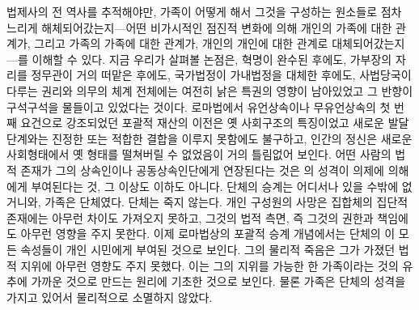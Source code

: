 법제사의 전 역사를 추적해야만,
가족이 어떻게 해서 그것을 구성하는 원소들로 점차 느리게
해체되어갔는지---어떤 비가시적인 점진적 변화에 의해
개인의 가족에 대한 관계가,
그리고 가족의 가족에 대한 관계가,
개인의 개인에 대한 관계로 대체되어갔는지---를
이해할 수 있다.
지금 우리가 살펴볼 논점은,
혁명이 완수된 후에도,
가부장의 자리를 정무관이 거의 떠맡은 후에도,
국가법정이 가내법정을 대체한 후에도,
사법당국이 다루는 권리와 의무의 체계 전체에는 여전히
낡은 특권의 영향이 남아있었고 그 반향이 구석구석을 물들이고 있었다는 것이다.
로마법에서 유언상속이나 무유언상속의 첫 번째 요건으로 강조되었던
포괄적 재산의 이전은 옛 사회구조의 특징이었고
새로운 발달단계와는 진정한 또는 적합한 결합을 이루지 못함에도 불구하고,
인간의 정신은 새로운 사회형태에서 옛 형태를 떨쳐버릴 수 없었음이
거의 틀림없어 보인다.
어떤 사람의 법적 존재가 그의 상속인이나 공동상속인단에게
연장된다는 것은
의 성격이 의제에 의해 에게 부여된다는 것,
그 이상도 이하도 아니다.
단체의 승계는 어디서나 있을 수밖에 없거니와, 가족은 단체였다.
단체는 죽지 않는다.
개인 구성원의 사망은 집합체의 집단적 존재에는 아무런 차이도 가져오지 못하고,
그것의 법적 측면, 즉 그것의 권한과 책임에도 아무런 영향을 주지 못한다.
이제 로마법상의 포괄적 승계 개념에서는
단체의 이 모든 속성들이 개인 시민에게
부여된 것으로 보인다.
그의 물리적 죽음은 그가 가졌던 법적 지위에 아무런 영향도 주지 못했다.
이는 그의 지위를
가능한 한
가족이라는 것의 유추에 가까운 것으로 만드는
원리에 기초한 것으로 보인다.
물론 가족은 단체의 성격을 가지고 있어서 물리적으로 소멸하지 않았다.

